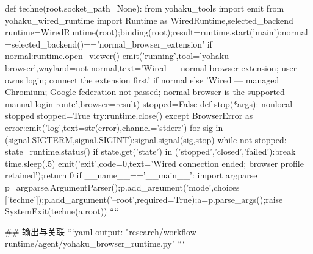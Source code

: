 def techne(root,socket_path=None):
 from yohaku_tools import emit
 from yohaku_wired_runtime import Runtime as WiredRuntime,selected_backend
 runtime=WiredRuntime(root);binding(root);result=runtime.start('main');normal=selected_backend()=='normal_browser_extension'
 if normal:runtime.open_viewer()
 emit('running',tool='yohaku-browser',wayland=not normal,text='Wired — normal browser extension; user owns login; connect the extension first' if normal else 'Wired — managed Chromium; Google federation not passed; normal browser is the supported manual login route',browser=result)
 stopped=False
 def stop(*args):
  nonlocal stopped
  stopped=True
  try:runtime.close()
  except BrowserError as error:emit('log',text=str(error),channel='stderr')
 for sig in (signal.SIGTERM,signal.SIGINT):signal.signal(sig,stop)
 while not stopped:
  state=runtime.status()
  if state.get('state') in ('stopped','closed','failed'):break
  time.sleep(.5)
 emit('exit',code=0,text='Wired connection ended; browser profile retained');return 0
if __name__=='__main__':
 import argparse
 p=argparse.ArgumentParser();p.add_argument('mode',choices=['techne']);p.add_argument('--root',required=True);a=p.parse_args();raise SystemExit(techne(a.root))
````

## 输出与关联
```yaml
output: "research/workflow-runtime/agent/yohaku_browser_runtime.py"
```

